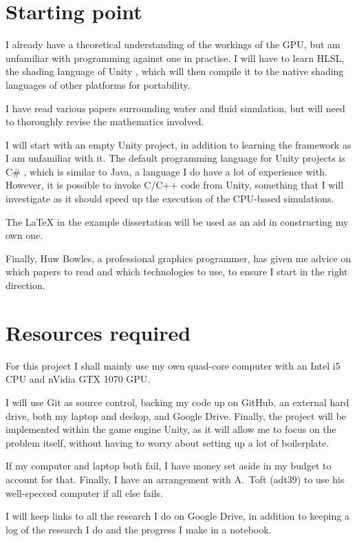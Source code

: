 \section*{Starting point}

I already have a theoretical understanding of the workings of the GPU, but am
unfamiliar with programming against one in practise. I will have to learn HLSL,
the shading language of Unity \cite{UnityComputeShaders}, which will then compile it to
the native shading languages of other platforms for portability.

I have read various papers surrounding water and fluid simulation, but will need
to thoroughly revise the mathematics involved.

I will start with an empty Unity project, in addition to learning the framework
as I am unfamiliar with it. The default programming language for Unity projects
is C\# \cite{UnityScripts}, which is similar to Java, a language I do have a lot
of experience with. However, it is possible to invoke C/C++ code from Unity,
something that I will investigate as it should speed up the execution of the
CPU-based simulations.

The LaTeX in the example dissertation will be used as an aid in constructing my
own one.

Finally, Huw Bowles, a professional graphics programmer, has given me advice on
which papers to read and which technologies to use, to ensure I start in the
right direction.

\section*{Resources required}

For this project I shall mainly use my own quad-core computer with an Intel i5
CPU and nVidia GTX 1070 GPU.

I will use Git as source control, backing my code up on GitHub, an external hard
drive, both my laptop and deskop, and Google Drive. Finally, the project will be
implemented within the game engine Unity, as it will allow me to focus on the
problem itself, without having to worry about setting up a lot of boilerplate.

If my computer and laptop both fail, I have money set aside in my budget to
account for that. Finally, I have an arrangement with A.~Toft (adt39) to use his
well-specced computer if all else fails.

I will keep links to all the research I do on Google Drive, in addition to
keeping a log of the research I do and the progress I make in a notebook.

